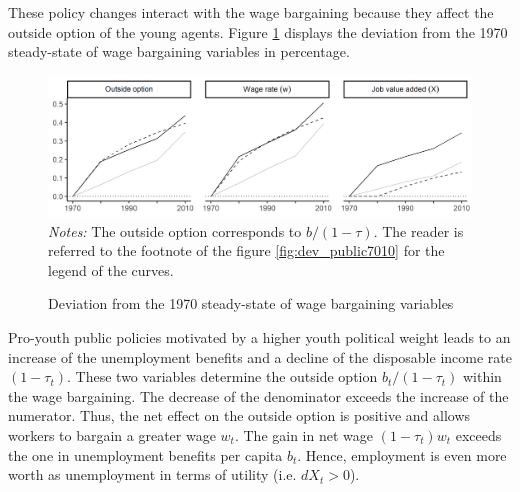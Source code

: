 
These policy changes interact with the wage bargaining because they affect the outside option of the young agents. Figure \ref{fig:dev_bargain7010} displays the deviation from the 1970 steady-state of wage bargaining variables in percentage.
\begin{figure}[tb]
	\centering
	\caption{Deviation from the 1970 steady-state of wage bargaining variables} \label{fig:dev_bargain7010}
	\includegraphics[width=1\linewidth]{../result/deviation/dev_bargain7010.png}
	\vspace{-6ex}
	\justify\singlespacing\footnotesize \textit{Notes:} The outside option corresponds to $b/(1-\tau)$. The reader is referred to the footnote of the figure \ref{fig:dev_public7010} for the legend of the curves.
\end{figure}
Pro-youth public policies motivated by a higher youth political weight leads to an increase of the unemployment benefits and a decline of the disposable income rate $(1-\tau_t)$. These two variables determine the outside option $b_t/(1-\tau_t)$ within the wage bargaining. The decrease of the denominator exceeds the increase of the numerator. Thus, the net effect on the outside option is positive and allows workers to bargain a greater wage $w_t$. The gain in net wage $(1-\tau_t)w_t$ exceeds the one in unemployment benefits per capita $b_t$. Hence, employment is even more worth as unemployment in terms of utility (i.e. $dX_t > 0$).

